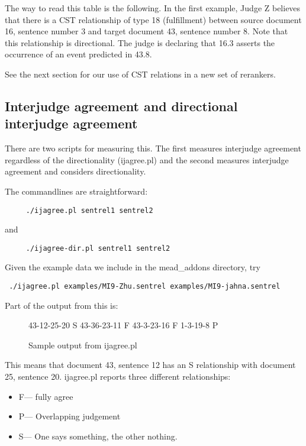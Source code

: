\documentclass[10pt]{article}
\begin{document}
The way to read this table is the following. In the first example, Judge Z believes that 
there is 
a CST relationship of type 18 (fulfillment) between source document 16, sentence number 
3 and target document 43, sentence number 8.  Note that this relationship is directional.  
The judge is declaring that 16.3 asserts the occurrence of an event predicted in 43.8.

See the next section for our use of CST relations in a new set of rerankers.  

\subsection{Interjudge agreement and directional interjudge agreement}
There are two scripts for measuring this.  The first measures interjudge agreement 
regardless of the directionality (ijagree.pl) and the second measures interjudge 
agreement and considers directionality.

The commandlines are straightforward:

\begin{verbatim}
     ./ijagree.pl sentrel1 sentrel2
\end{verbatim}

and

\begin{verbatim}
     ./ijagree-dir.pl sentrel1 sentrel2
\end{verbatim}


Given the example data we include in the mead\_addons directory, try

\begin{verbatim}
 ./ijagree.pl examples/MI9-Zhu.sentrel examples/MI9-jahna.sentrel
\end{verbatim}

Part of the output from this is:
\begin{figure}[htp!]
\centering
\begin{boxedverbatim}
43-12-25-20     S
43-36-23-11     F
43-3-23-16      F
1-3-19-8        P
\end{boxedverbatim}
\caption{Sample output from ijagree.pl}
\label{figure:ijagree.pl}
\end{figure}

This means that document 43, sentence 12 has an S relationship with document 25, 
sentence 20.  ijagree.pl reports three different relationships:

\begin{itemize}
        \item F--- fully agree
        \item P--- Overlapping judgement
        \item S--- One says something, the other nothing.
\end{itemize}
\end{document}
